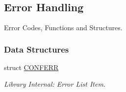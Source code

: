 \hypertarget{group__errors}{\subsection{Error Handling}
\label{group__errors}
}


Error Codes, Functions and Structures.  


\subsubsection*{Data Structures}
\begin{DoxyCompactItemize}
\item 
struct \hyperlink{struct_c_o_n_f_e_r_r}{C\-O\-N\-F\-E\-R\-R}
\begin{DoxyCompactList}\small\item\em Library Internal\-: Error List Item. \end{DoxyCompactList}\end{DoxyCompactItemize}
